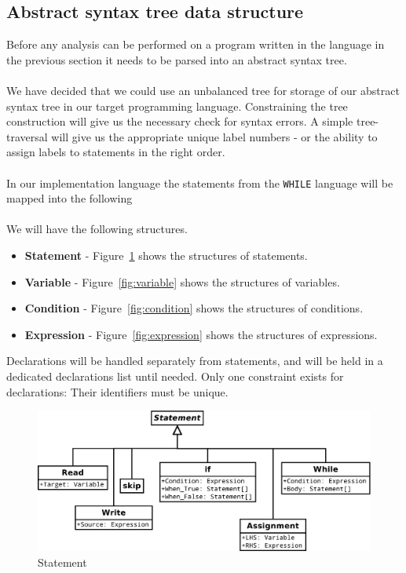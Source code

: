\subsection{Abstract syntax tree data structure}\label{section:Abstractsyntaxtreedatastructure}
\label{sec:constructing_ast}
Before any analysis can be performed on a program written in the language in the previous section it needs to be parsed into an abstract syntax tree.\\\\
We have decided that we could use an unbalanced tree for storage of our abstract syntax tree in our target programming language. Constraining the tree construction will give us the necessary check for syntax errors.
A simple tree-traversal will give us the appropriate unique label numbers - or the ability to assign labels to statements in the right order.
\\
\\
In our implementation language the statements from the \texttt{WHILE} language will be mapped into the following  
\\\\
We will have the following structures.
\begin{itemize}
	\item \textbf{Statement} - Figure~\ref{fig:statement} shows the structures of statements.
	\item \textbf{Variable} - Figure~\ref{fig:variable} shows the structures of variables.
	\item \textbf{Condition} - Figure~\ref{fig:condition} shows the structures of conditions.
	\item \textbf{Expression} - Figure~\ref{fig:expression} shows the structures of expressions.
\end{itemize}
Declarations will be handled separately from statements, and will be held in a dedicated declarations list until needed. Only one constraint exists for declarations: Their identifiers must be unique.

\begin{figure}[h]
	\centering
	\includegraphics[scale=.3]{../fig/Statement}
	\caption{Statement}
	\label{fig:statement}
\end{figure}

